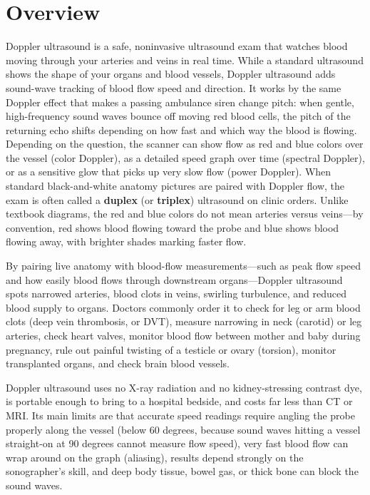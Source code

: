 \label{ch:infographic-doppler-ultrasound}

\section{Overview}

Doppler ultrasound is a safe, noninvasive ultrasound exam that watches blood moving through your arteries and veins in real time. While a standard ultrasound shows the shape of your organs and blood vessels, Doppler ultrasound adds sound-wave tracking of blood flow speed and direction. It works by the same Doppler effect that makes a passing ambulance siren change pitch: when gentle, high-frequency sound waves bounce off moving red blood cells, the pitch of the returning echo shifts depending on how fast and which way the blood is flowing. Depending on the question, the scanner can show flow as red and blue colors over the vessel (color Doppler), as a detailed speed graph over time (spectral Doppler), or as a sensitive glow that picks up very slow flow (power Doppler). When standard black-and-white anatomy pictures are paired with Doppler flow, the exam is often called a \textbf{duplex} (or \textbf{triplex}) ultrasound on clinic orders. Unlike textbook diagrams, the red and blue colors do not mean arteries versus veins---by convention, red shows blood flowing toward the probe and blue shows blood flowing away, with brighter shades marking faster flow.

By pairing live anatomy with blood-flow measurements---such as peak flow speed and how easily blood flows through downstream organs---Doppler ultrasound spots narrowed arteries, blood clots in veins, swirling turbulence, and reduced blood supply to organs. Doctors commonly order it to check for leg or arm blood clots (deep vein thrombosis, or DVT), measure narrowing in neck (carotid) or leg arteries, check heart valves, monitor blood flow between mother and baby during pregnancy, rule out painful twisting of a testicle or ovary (torsion), monitor transplanted organs, and check brain blood vessels.

Doppler ultrasound uses no X-ray radiation and no kidney-stressing contrast dye, is portable enough to bring to a hospital bedside, and costs far less than CT or MRI. Its main limits are that accurate speed readings require angling the probe properly along the vessel (below 60 degrees, because sound waves hitting a vessel straight-on at 90 degrees cannot measure flow speed), very fast blood flow can wrap around on the graph (aliasing), results depend strongly on the sonographer's skill, and deep body tissue, bowel gas, or thick bone can block the sound waves.

